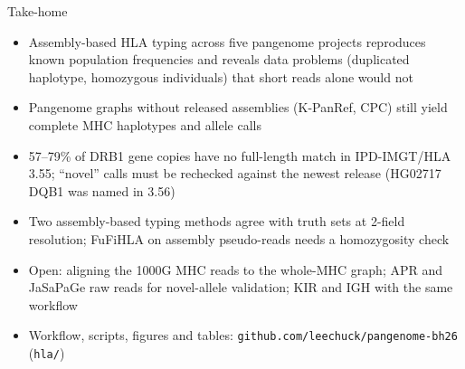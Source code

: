 \documentclass[aspectratio=169,11pt]{beamer}
\begin{document}
\begin{frame}{Take-home}
  \begin{itemize}
    \item Assembly-based HLA typing across five pangenome projects reproduces known population frequencies and reveals data problems (duplicated haplotype, homozygous individuals) that short reads alone would not
    \item Pangenome graphs without released assemblies (K-PanRef, CPC) still yield complete MHC haplotypes and allele calls
    \item 57--79\% of DRB1 gene copies have no full-length match in IPD-IMGT/HLA 3.55; ``novel'' calls must be rechecked against the newest release (HG02717 DQB1 was named in 3.56)
    \item Two assembly-based typing methods agree with truth sets at 2-field resolution; FuFiHLA on assembly pseudo-reads needs a homozygosity check
    \item Open: aligning the 1000G MHC reads to the whole-MHC graph; APR and JaSaPaGe raw reads for novel-allele validation; KIR and IGH with the same workflow
    \item Workflow, scripts, figures and tables: \texttt{github.com/leechuck/pangenome-bh26} (\texttt{hla/})
  \end{itemize}
\end{frame}
\end{document}
